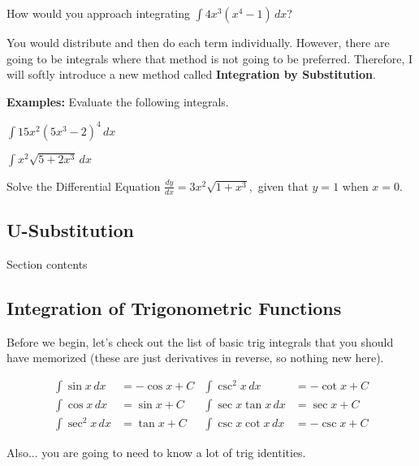 \documentclass[addpoints, 12pt]{exam}
\begin{document}
How would you approach integrating $\displaystyle\int 4x^3\left(x^4-1\right)\,dx$?

You would distribute and then do each term individually. However, there are going to be integrals where that method is not going to be preferred. Therefore, I will softly introduce a new method called \textbf{Integration by Substitution}.

\noindent\textbf{Examples:} Evaluate the following integrals.
\begin{questions}
    \question $\displaystyle\int15x^2(5x^3-2)^4\,dx$
    
    \question $\displaystyle\int x^2\sqrt{5+2x^3}\,dx$
    
    Solve the Differential Equation
    \question $\displaystyle\frac{dy}{dx}=3x^2\sqrt{1+x^3},$ given that $y=1$ when $x=0$.
\end{questions}

\newpage
{}
\subsection*{U-Substitution}
Section contents


\newpage
{}
\subsection*{Integration of Trigonometric Functions}
Before we begin, let's check out the list of basic trig integrals that you should have memorized (these are just derivatives in reverse, so nothing new here).

\begin{tcolorbox}[title= INTEGRALS OF BASIC TRIG FUNCTIONS,black,sharp corners,colback=white,colbacktitle=white,coltitle=black,boxrule=1pt]

    \begin{align*}
        \int\sin x\,dx &= -\cos x+C & \int\csc^2 x\,dx &= -\cot x+C\\
        \int\cos x\,dx &= \sin x+C & \int\sec x\tan x\,dx &= \sec x+C\\
        \int\sec^2 x\,dx &= \tan x+C & \int\csc x\cot x\,dx &= -\csc x+C
    \end{align*}
    \vspace{.05cm}
\end{tcolorbox}
Also... you are going to need to know a lot of trig identities.
\end{document}
